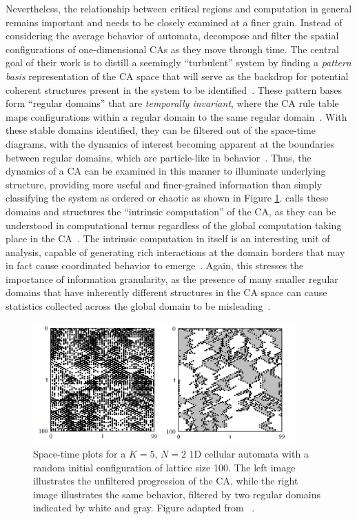 \documentclass[a4paper,11pt]{report}
\begin{document}
Nevertheless, the relationship between critical regions and computation in general remains important and needs to be closely examined at a finer grain. Instead of considering the average behavior of automata, \citeauthor{cr93} decompose and filter the spatial configurations of one-dimensional CAs as they move through time. The central goal of their work is to distill a seemingly ``turbulent'' system by finding a \textit{pattern basis} representation of the CA space that will serve as the backdrop for potential coherent structures present in the system to be identified~\cite{cr93}. These pattern bases form ``regular domains'' that are \textit{temporally invariant}, where the CA rule table maps configurations within a regular domain to the same regular domain~\cite{mi96}. With these stable domains identified, they can be filtered out of the space-time diagrams, with the dynamics of interest becoming apparent at the boundaries between regular domains, which are particle-like in behavior~\cite{cr93}. Thus, the dynamics of a CA can be examined in this manner to illuminate underlying structure, providing more useful and finer-grained information than simply classifying the system as ordered or chaotic as shown in Figure \ref{fig:ca_filter}. \citeauthor{cr93} calls these domains and structures the ``intrinsic computation'' of the CA, as they can be understood in computational terms regardless of the global computation taking place in the CA~\cite{mi96}. The intrinsic computation in itself is an interesting unit of analysis, capable of generating rich interactions at the domain borders that may in fact cause coordinated behavior to emerge~\cite{cr95}. Again, this stresses the importance of information granularity, as the presence of many smaller regular domains that have inherently different structures in the CA space can cause statistics collected across the global domain to be misleading~\cite{cr93}.

\begin{figure}[htp]
\centering
\includegraphics[width=0.9\textwidth]{cr93_fig3.png}
\caption[Filtered CA Behavior]{
Space-time plots for a $K=5$, $N=2$ 1D cellular automata with a random initial configuration of lattice size 100. The left image illustrates the unfiltered progression of the CA, while the right image illustrates the same behavior, filtered by two regular domains indicated by white and gray. Figure adapted from \citeauthor{cr93}~\cite{cr93}.
}
\label{fig:ca_filter}
\end{figure}
\end{document}
